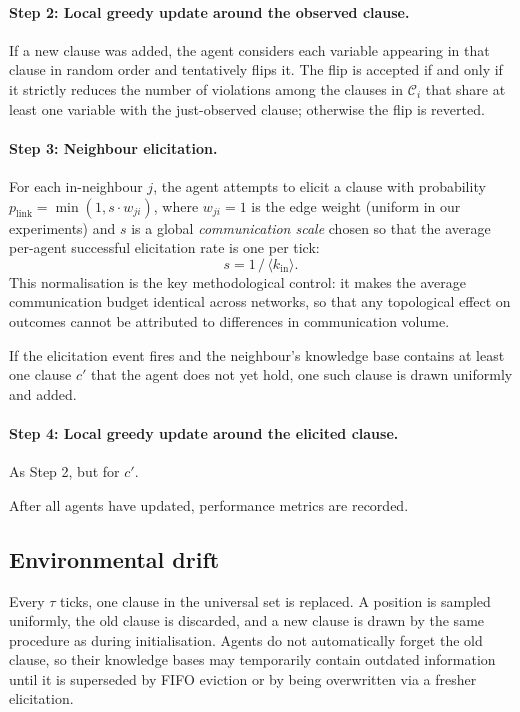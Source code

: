 \documentclass{article}
\begin{document}
\paragraph{Step 2: Local greedy update around the observed clause.} If a new clause was added, the agent considers each variable appearing in that clause in random order and tentatively flips it. The flip is accepted if and only if it strictly reduces the number of violations among the clauses in $\mathcal{C}_i$ that share at least one variable with the just-observed clause; otherwise the flip is reverted.

\paragraph{Step 3: Neighbour elicitation.} For each in-neighbour $j$, the agent attempts to elicit a clause with probability $p_{\text{link}} = \min(1, s \cdot w_{ji})$, where $w_{ji}=1$ is the edge weight (uniform in our experiments) and $s$ is a global \emph{communication scale} chosen so that the average per-agent successful elicitation rate is one per tick:
$$
s = 1\,/\,\langle k_{\text{in}}\rangle.
$$
This normalisation is the key methodological control: it makes the average communication budget identical across networks, so that any topological effect on outcomes cannot be attributed to differences in communication volume.

If the elicitation event fires and the neighbour's knowledge base contains at least one clause $c'$ that the agent does not yet hold, one such clause is drawn uniformly and added.

\paragraph{Step 4: Local greedy update around the elicited clause.} As Step 2, but for $c'$.

After all agents have updated, performance metrics are recorded.

\subsection{Environmental drift}

Every $\tau$ ticks, one clause in the universal set is replaced. A position is sampled uniformly, the old clause is discarded, and a new clause is drawn by the same procedure as during initialisation. Agents do not automatically forget the old clause, so their knowledge bases may temporarily contain outdated information until it is superseded by FIFO eviction or by being overwritten via a fresher elicitation.
\end{document}
